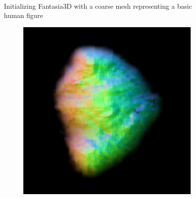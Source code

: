 \begin{figure}[ht]
\begin{subfigure}[b]{0.37\textwidth}
        \caption{}
    \end{subfigure}
    \caption{Initializing Fantasia3D with a coarse mesh representing a basic human figure}~\label{fig:generationFantasia2}
\end{figure}



\begin{figure}[ht]
    \centering
    \begin{subfigure}[b]{0.222\textwidth}
        \centering
        \fontsize{9pt}{7pt}\selectfont{}\vspace{.1cm}
        \includegraphics[width=\textwidth]{etc/a robot made out of plants/magic123/magic123_coarse_robot_right_0_part2.png}

\end{subfigure}
\end{figure}
